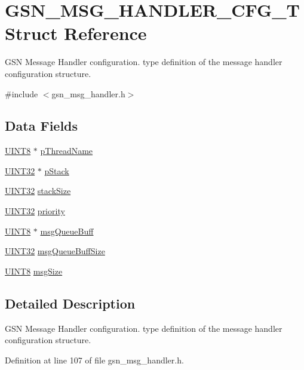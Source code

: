 \hypertarget{a00154}{
\section{GSN\_\-MSG\_\-HANDLER\_\-CFG\_\-T Struct Reference}
\label{a00154}
}


GSN Message Handler configuration. type definition of the message handler configuration structure.  




{\ttfamily \#include $<$gsn\_\-msg\_\-handler.h$>$}

\subsection*{Data Fields}
\begin{DoxyCompactItemize}
\item 
\hyperlink{a00660_gab27e9918b538ce9d8ca692479b375b6a}{UINT8} $\ast$ \hyperlink{a00154_a68c7baaa708ea9444e91f4e331ebc579}{pThreadName}
\item 
\hyperlink{a00660_gae1e6edbbc26d6fbc71a90190d0266018}{UINT32} $\ast$ \hyperlink{a00154_a06dc12db7ec3c52d8dc551e9e8f77e63}{pStack}
\item 
\hyperlink{a00660_gae1e6edbbc26d6fbc71a90190d0266018}{UINT32} \hyperlink{a00154_a82cabdcaee43fc729a1da5551d429f73}{stackSize}
\item 
\hyperlink{a00660_gae1e6edbbc26d6fbc71a90190d0266018}{UINT32} \hyperlink{a00154_a4eb2b736accd00141e11004adc0fded0}{priority}
\item 
\hyperlink{a00660_gab27e9918b538ce9d8ca692479b375b6a}{UINT8} $\ast$ \hyperlink{a00154_a7e51f5f5131592004e739bcc100a27fc}{msgQueueBuff}
\item 
\hyperlink{a00660_gae1e6edbbc26d6fbc71a90190d0266018}{UINT32} \hyperlink{a00154_a21640f5a1df0caa651f4ffe4280d6210}{msgQueueBuffSize}
\item 
\hyperlink{a00660_gab27e9918b538ce9d8ca692479b375b6a}{UINT8} \hyperlink{a00154_aafd0a2e6e8c7d8ff4ee52626581abe6f}{msgSize}
\end{DoxyCompactItemize}


\subsection{Detailed Description}
GSN Message Handler configuration. type definition of the message handler configuration structure. 

Definition at line 107 of file gsn\_\-msg\_\-handler.h.




